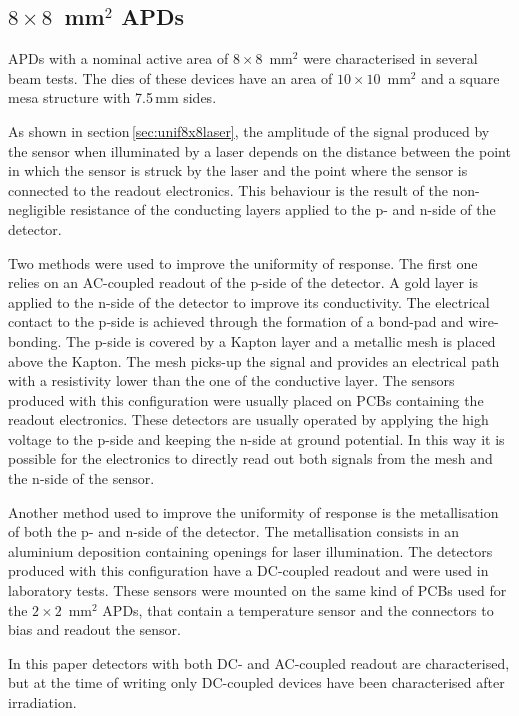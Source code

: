 \documentclass[review,number,sort&compress]{elsarticle}
\begin{document}
\subsection{$8 \times 8$~mm$^2$ APDs}

APDs with a nominal active area of $8 \times 8$~mm$^2$ were characterised in several beam tests.
The dies of these devices have an area of $10 \times 10$~mm$^2$ and a square mesa structure with 7.5\,mm sides.

As shown in section\,\ref{sec:unif8x8laser}, the amplitude of the signal produced by the sensor when illuminated by a laser depends on the distance between the point in which the sensor is struck by the laser and the point where the sensor is connected to the readout electronics.
This behaviour is the result of the non-negligible resistance of the conducting layers applied to the p- and n-side of the detector.

Two methods were used to improve the uniformity of response.
The first one relies on an AC-coupled readout of the p-side of the detector.
A gold layer is applied to the n-side of the detector to improve its conductivity.
The electrical contact to the p-side is achieved through the formation of a bond-pad and wire-bonding.
The p-side is covered by a Kapton layer and a metallic mesh is placed above the Kapton.
The mesh picks-up the signal and provides an electrical path with a resistivity lower than the one of the conductive layer.
The sensors produced with this configuration were usually placed on PCBs containing the readout electronics.
These detectors are usually operated by applying the high voltage to the p-side and keeping the n-side at ground potential.
In this way it is possible for the electronics to directly read out both signals from the mesh and the n-side of the sensor.

Another method used to improve the uniformity of response is the metallisation of both the p- and n-side of the detector.
The metallisation consists in an aluminium deposition containing openings for laser illumination.
The detectors produced with this configuration have a DC-coupled readout and were used in laboratory tests.
These sensors were mounted on the same kind of PCBs used for the $2 \times 2$~mm$^2$ APDs, that contain a temperature sensor and the connectors to bias and readout the sensor.

In this paper detectors with both DC- and AC-coupled readout are characterised, but at the time of writing only DC-coupled devices have been characterised after irradiation. 
\end{document}
